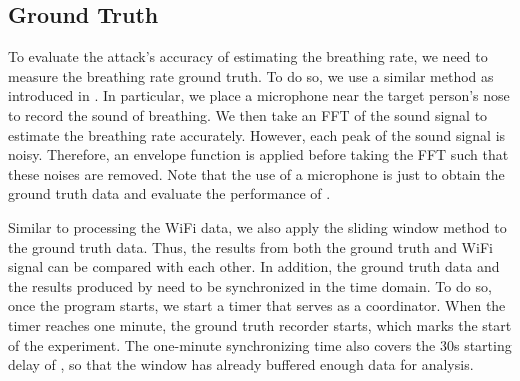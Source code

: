 \subsection{Ground Truth}
\label{sec:ground_truth}
To evaluate the attack's accuracy of estimating the breathing rate, we need to measure the breathing rate ground truth. %
To do so, we use a similar method as introduced in \cite{dafna2015sleep}. In particular, we place a microphone near the target person's nose to record the sound of breathing. We then take an FFT of the sound signal to estimate the breathing rate accurately. However, each peak of the sound signal is noisy. Therefore, an envelope function is applied before taking the FFT such that these noises are removed. Note that the use of a microphone is just to obtain the ground truth data and evaluate the performance of \wisneak.



Similar to processing the WiFi data, we also apply the sliding window method to the ground truth data. Thus, the results from both the ground truth and WiFi signal can be compared with each other. In addition, the ground truth data and the results produced by \wisneak need to be synchronized in the time domain. To do so, once the program starts, we start a timer that serves as a coordinator. When the timer reaches one minute, the ground truth recorder starts, which marks the start of the experiment. 
The one-minute synchronizing time also covers the $30$s starting delay of \wisneak, so that the window has already buffered enough data for analysis.



